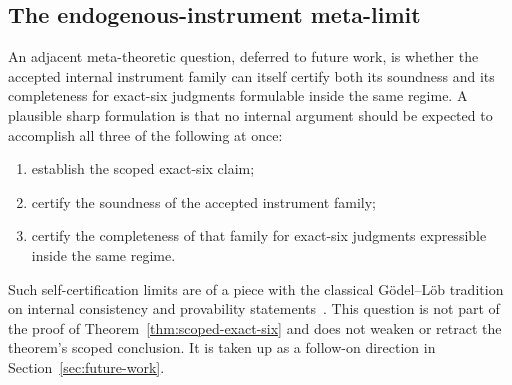 \subsection{The endogenous-instrument meta-limit}\label{subsec:meta-limit}

An adjacent meta-theoretic question, deferred to future work, is
whether the accepted internal instrument family can itself certify
both its soundness and its completeness for exact-six judgments
formulable inside the same regime. A plausible sharp formulation is
that no internal argument should be expected to accomplish all three
of the following at once:
\begin{enumerate}[topsep=2pt,itemsep=1pt]
  \item establish the scoped exact-six claim;
  \item certify the soundness of the accepted instrument family;
  \item certify the completeness of that family for exact-six
    judgments expressible inside the same regime.
\end{enumerate}
Such self-certification limits are of a piece with the classical
G{\"o}del--L{\"o}b tradition on internal consistency and provability
statements~\citep{Godel1931,Lob1955}. This question is not part of
the proof of Theorem~\ref{thm:scoped-exact-six} and does not weaken
or retract the theorem's scoped conclusion. It is taken up as a
follow-on direction in Section~\ref{sec:future-work}.
